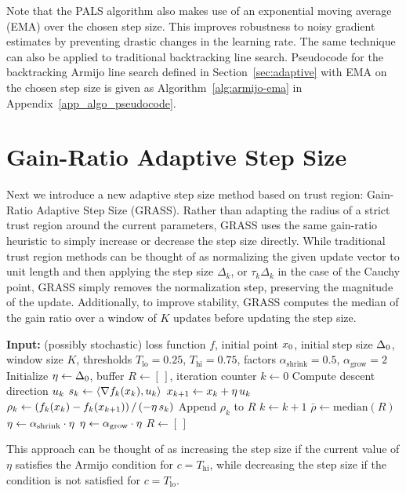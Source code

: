 Note that the PALS algorithm also makes use of an exponential moving average (EMA) over the chosen step size. This improves robustness to noisy gradient estimates by preventing drastic changes in the learning rate. The same technique can also be applied to traditional backtracking line search.
Pseudocode for the backtracking Armijo line search defined in Section~\ref{sec:adaptive} with EMA on the chosen step size is given as Algorithm~\ref{alg:armijo-ema} in Appendix~\ref{app_algo_pseudocode}.

\FloatBarrier
\section{Gain-Ratio Adaptive Step Size} \label{sec:grass}
Next we introduce a new adaptive step size method based on trust region: Gain-Ratio Adaptive Step Size (GRASS). Rather than adapting the radius of a strict trust region around the current parameters, GRASS uses the same gain-ratio heuristic to simply increase or decrease the step size directly. While traditional trust region methods can be thought of as normalizing the given update vector to unit length and then applying the step size $\Delta_k$, or $\tau_k \Delta_k$ in the case of the Cauchy point, GRASS simply removes the normalization step, preserving the magnitude of the update. Additionally, to improve stability, GRASS computes the median of the gain ratio over a window of $K$ updates before updating the step size.

\begin{algorithm}[H]
\caption{Gain-Ratio Adaptive Step Size (GRASS)}
\label{alg:grass}
\begin{algorithmic}[1]
\State \textbf{Input:} (possibly stochastic) loss function $f$, initial point $x_{0}$, initial step size $\Delta_0$, window size $K$, thresholds $T_{\text{lo}} = 0.25$, $T_{\text{hi}} = 0.75$, factors $\alpha_{\text{shrink}} = 0.5$, $\alpha_{\text{grow}} = 2$
\State Initialize $\eta \gets \Delta_0$, buffer $R \gets [\,]$, iteration counter $k \gets 0$
    \State Compute descent direction $u_{k}$
    \State $s_k \gets \langle \nabla f_k(x_{k}), u_{k} \rangle$ 
    \State $x_{k+1} \gets x_{k} + \eta \, u_{k}$
    \State $\rho_k \gets \left(f_k(x_{k}) - f_k(x_{k+1})\right) / \left(-\eta \, s_k\right)$
    \State Append $\rho_k$ to $R$
    \State $k \gets k + 1$
        \State $\bar{\rho} \gets \text{median}(R)$
            \State $\eta \gets \alpha_{\text{shrink}} \cdot \eta$
            \State $\eta \gets \alpha_{\text{grow}} \cdot \eta$
        \EndIf
        \State $R \gets [\,]$
    \EndIf
\EndFor
\end{algorithmic}
\end{algorithm}
This approach can be thought of as increasing the step size if the current value of $\eta$ satisfies the Armijo condition for $c = T_{\text{hi}}$, while decreasing the step size if the condition is not satisfied for $c = T_{\text{lo}}$.


